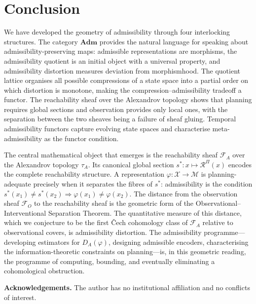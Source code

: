 \documentclass[11pt, a4paper]{article}
\theoremstyle{plain}
\theoremstyle{definition}
\theoremstyle{remark}
\newcommand{\calX}{\mathcal{X}}
\newcommand{\calM}{\mathcal{M}}
\newcommand{\calF}{\mathcal{F}}
\newcommand{\calR}{\mathcal{R}}
\newcommand{\DA}{D_{A}(\varphi)}
\newcommand{\Adm}{\mathbf{Adm}}
\begin{document}
\section{Conclusion}
\label{sec:conclusion}

We have developed the geometry of admissibility through four interlocking
structures. The category $\Adm$ provides the natural language for speaking
about admissibility-preserving maps: admissible representations are morphisms,
the admissibility quotient is an initial object with a universal property, and
admissibility distortion measures deviation from morphismhood. The quotient
lattice organises all possible compressions of a state space into a partial
order on which distortion is monotone, making the compression--admissibility
tradeoff a functor. The reachability sheaf over the Alexandrov topology shows
that planning requires global sections and observation provides only local
ones, with the separation between the two sheaves being a failure of sheaf
gluing. Temporal admissibility functors capture evolving state spaces and
characterise meta-admissibility as the functor condition.

The central mathematical object that emerges is the reachability sheaf $\calF_A$
over the Alexandrov topology $\tau_A$. Its canonical global section $s^*\colon
x \mapsto \calR^\Pi(x)$ encodes the complete reachability structure. A
representation $\varphi\colon \calX \to \calM$ is planning-adequate precisely
when it separates the fibres of $s^*$: admissibility is the condition
$s^*(x_1) \neq s^*(x_2) \Rightarrow \varphi(x_1) \neq \varphi(x_2)$. The distance from the observation sheaf
$\calF_O$ to the reachability sheaf is the geometric form of the
Observational--Interventional Separation Theorem. The quantitative measure of
this distance, which we conjecture to be the first \v{C}ech cohomology class
of $\calF_A$ relative to observational covers, is admissibility distortion.
The admissibility programme---developing estimators for $\DA$, designing
admissible encoders, characterising the information-theoretic constraints on
planning---is, in this geometric reading, the programme of computing, bounding,
and eventually eliminating a cohomological obstruction.

\bigskip
\noindent\textbf{Acknowledgements.} The author has no institutional affiliation
and no conflicts of interest.
\end{document}
